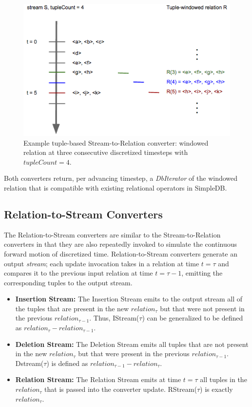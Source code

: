 \documentclass[a4paper, 10pt, conference]{IEEEconf}
\begin{document}
\begin{itemize}
\begin{figure}[h!]
    \centering
    \centerline{\includegraphics[totalheight=4cm]{tuple_window.png}}
    \caption{Example tuple-based Stream-to-Relation converter: windowed relation at three consecutive discretized timesteps with $tupleCount = 4$.}
    \label{fig:tuple_window}
\end{figure}
\end{itemize}

Both converters return, per advancing timestep, a \textit{DbIterator} of the windowed relation that is compatible with existing relational operators in SimpleDB.

\subsection{Relation-to-Stream Converters}
The Relation-to-Stream converters are similar to the Stream-to-Relation converters in that they are also repeatedly invoked to simulate the continuous forward motion of discretized time. Relation-to-Stream converters generate an output \textit{stream}; each update invocation takes in a relation at time $t = \tau$ and compares it to the previous input relation at time $t = \tau - 1$, emitting the corresponding tuples to the output stream. 

\begin{itemize}
\item \textbf{Insertion Stream:} The Insertion Stream emits to the output stream all of the tuples that are present in the new $relation_{\tau}$ but that were not present in the previous $relation_{\tau - 1}$. Thus, IStream($\tau$) can be generalized to be defined as $relation_{\tau} -relation_{\tau - 1}$.

\item \textbf{Deletion Stream:} The Deletion Stream emits all tuples that are not present in the new $relation_{\tau}$ but that were present in the previous $relation_{\tau - 1}$. Dstream($\tau$) is defined as $relation_{\tau - 1} - relation_{\tau}$.

\item \textbf{Relation Stream:} The Relation Stream emits at time $t = \tau$ all tuples in the $relation_{\tau}$ that is passed into the converter update. RStream($\tau$) is exactly $relation_{\tau}$.
\end{itemize}
\end{document}
